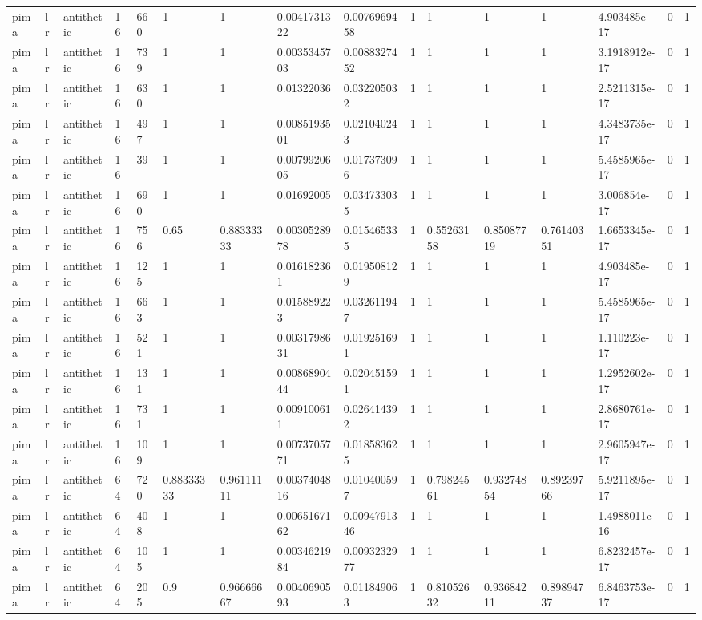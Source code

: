 \begin{tabular}{llllllllllllllll}
pima & lr & antithetic & 16 & 660 & 1 & 1 & 0.0041731322 & 0.0076969458 & 1 & 1 & 1 & 1 & 4.903485e-17 & 0 & 1 \\
pima & lr & antithetic & 16 & 739 & 1 & 1 & 0.0035345703 & 0.0088327452 & 1 & 1 & 1 & 1 & 3.1918912e-17 & 0 & 1 \\
pima & lr & antithetic & 16 & 630 & 1 & 1 & 0.01322036 & 0.032205032 & 1 & 1 & 1 & 1 & 2.5211315e-17 & 0 & 1 \\
pima & lr & antithetic & 16 & 497 & 1 & 1 & 0.0085193501 & 0.021040243 & 1 & 1 & 1 & 1 & 4.3483735e-17 & 0 & 1 \\
pima & lr & antithetic & 16 & 39 & 1 & 1 & 0.0079920605 & 0.017373096 & 1 & 1 & 1 & 1 & 5.4585965e-17 & 0 & 1 \\
pima & lr & antithetic & 16 & 690 & 1 & 1 & 0.01692005 & 0.034733035 & 1 & 1 & 1 & 1 & 3.006854e-17 & 0 & 1 \\
pima & lr & antithetic & 16 & 756 & 0.65 & 0.88333333 & 0.0030528978 & 0.015465335 & 1 & 0.55263158 & 0.85087719 & 0.76140351 & 1.6653345e-17 & 0 & 1 \\
pima & lr & antithetic & 16 & 125 & 1 & 1 & 0.016182361 & 0.019508129 & 1 & 1 & 1 & 1 & 4.903485e-17 & 0 & 1 \\
pima & lr & antithetic & 16 & 663 & 1 & 1 & 0.015889223 & 0.032611947 & 1 & 1 & 1 & 1 & 5.4585965e-17 & 0 & 1 \\
pima & lr & antithetic & 16 & 521 & 1 & 1 & 0.0031798631 & 0.019251691 & 1 & 1 & 1 & 1 & 1.110223e-17 & 0 & 1 \\
pima & lr & antithetic & 16 & 131 & 1 & 1 & 0.0086890444 & 0.020451591 & 1 & 1 & 1 & 1 & 1.2952602e-17 & 0 & 1 \\
pima & lr & antithetic & 16 & 731 & 1 & 1 & 0.009100611 & 0.026414392 & 1 & 1 & 1 & 1 & 2.8680761e-17 & 0 & 1 \\
pima & lr & antithetic & 16 & 109 & 1 & 1 & 0.0073705771 & 0.018583625 & 1 & 1 & 1 & 1 & 2.9605947e-17 & 0 & 1 \\
pima & lr & antithetic & 64 & 720 & 0.88333333 & 0.96111111 & 0.0037404816 & 0.010400597 & 1 & 0.79824561 & 0.93274854 & 0.89239766 & 5.9211895e-17 & 0 & 1 \\
pima & lr & antithetic & 64 & 408 & 1 & 1 & 0.0065167162 & 0.0094791346 & 1 & 1 & 1 & 1 & 1.4988011e-16 & 0 & 1 \\
pima & lr & antithetic & 64 & 105 & 1 & 1 & 0.0034621984 & 0.0093232977 & 1 & 1 & 1 & 1 & 6.8232457e-17 & 0 & 1 \\
pima & lr & antithetic & 64 & 205 & 0.9 & 0.96666667 & 0.0040690593 & 0.011849063 & 1 & 0.81052632 & 0.93684211 & 0.89894737 & 6.8463753e-17 & 0 & 1 \\

\end{tabular}
